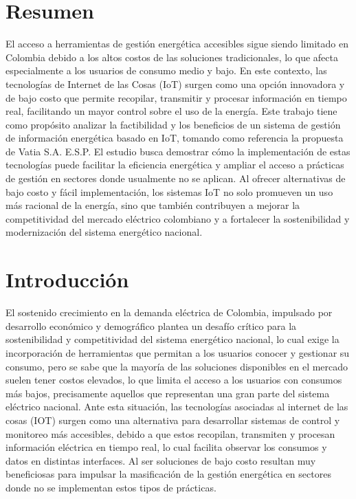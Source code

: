 \section{Resumen}
El acceso a herramientas de gestión energética accesibles sigue siendo limitado en Colombia debido a los altos costos de las soluciones tradicionales, lo que afecta especialmente a los usuarios de consumo medio y bajo. En este contexto, las tecnologías de Internet de las Cosas (IoT) surgen como una opción innovadora y de bajo costo que permite recopilar, transmitir y procesar información en tiempo real, facilitando un mayor control sobre el uso de la energía.
Este trabajo tiene como propósito analizar la factibilidad y los beneficios de un sistema de gestión de información energética basado en IoT, tomando como referencia la propuesta de Vatia S.A. E.S.P. El estudio busca demostrar cómo la implementación de estas tecnologías puede facilitar la eficiencia energética y ampliar el acceso a prácticas de gestión en sectores donde usualmente no se aplican. Al ofrecer alternativas de bajo costo y fácil implementación, los sistemas IoT no solo promueven un uso más racional de la energía, sino que también contribuyen a mejorar la competitividad del mercado eléctrico colombiano y a fortalecer la sostenibilidad y modernización del sistema energético nacional.

\section{Introducción}
El sostenido crecimiento en la demanda eléctrica de Colombia, impulsado por desarrollo económico y demográfico plantea un desafío crítico para la sostenibilidad y competitividad del sistema energético nacional, lo cual exige la incorporación de herramientas que permitan a los usuarios conocer y gestionar su consumo, pero se sabe que la mayoría de las soluciones disponibles en el mercado suelen tener costos elevados, lo que limita el acceso a los usuarios con consumos más bajos, precisamente aquellos que representan una gran parte del sistema eléctrico nacional.  
\newline
Ante esta situación, las tecnologías asociadas al internet de las cosas (IOT) surgen como una alternativa para desarrollar sistemas de control y monitoreo más accesibles, debido a que estos recopilan, transmiten y procesan información eléctrica en tiempo real, lo cual facilita observar los consumos y datos en distintas interfaces. Al ser soluciones de bajo costo resultan muy beneficiosas para impulsar la masificación de la gestión energética en sectores donde no se implementan estos tipos de prácticas.  
\newline

